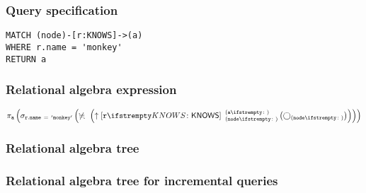 \subsubsection*{Query specification}

\begin{lstlisting}
MATCH (node)-[r:KNOWS]->(a)
WHERE r.name = 'monkey'
RETURN a
\end{lstlisting}

\subsubsection*{Relational algebra expression}

$\projection{\var{a}} \left(\selection{\mathtt{r.name~=~'monkey'}} \left(\alldifferent{} \left(\expandout{r}{KNOWS}{node}{a}{} \left(\getvertices{node}{}\right)\right)\right)\right)$

\subsubsection*{Relational algebra tree}


\subsubsection*{Relational algebra tree for incremental queries}



